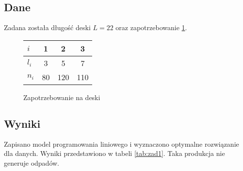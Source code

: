 \documentclass{article}
\begin{document}
\subsection{Dane}
Zadana została długość deski $L = 22$ oraz zapotrzebowanie \ref{fig:zad1}.
\begin{figure}[h]
    \centering
    \begin{tabular}{l|ccc}
        $i$ & 1 & 2 & 3 \\
        \hline
        $l_i$ & 3 & 5 & 7 \\
        \hline
        $n_i$ & 80 & 120 & 110 \\
    \end{tabular}
    \caption{Zapotrzebowanie na deski}
    \label{fig:zad1}
\end{figure}

\subsection{Wyniki}
Zapisano model programowania liniowego i wyznaczono optymalne rozwiązanie dla danych. 
Wyniki przedstawiono w tabeli \ref{tab:zad1}. Taka produkcja nie generuje odpadów.
\end{document}
